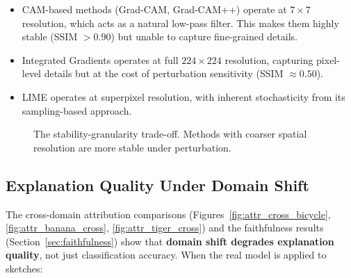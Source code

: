 \documentclass[12pt, a4paper]{article}
\begin{document}
\begin{itemize}[leftmargin=*]
    \item CAM-based methods (Grad-CAM, Grad-CAM++) operate at $7 \times 7$
          resolution, which acts as a natural low-pass filter.  This makes them
          highly stable (SSIM $> 0.90$) but unable to capture fine-grained
          details.
    \item Integrated Gradients operates at full $224 \times 224$ resolution,
          capturing pixel-level details but at the cost of perturbation
          sensitivity (SSIM $\approx 0.50$).
    \item LIME operates at superpixel resolution, with inherent stochasticity
          from its sampling-based approach.
\end{itemize}

\begin{figure}[H]
\centering
{}
\caption{The stability-granularity trade-off.  Methods with coarser spatial
resolution are more stable under perturbation.}
\label{fig:stability_tradeoff}
\end{figure}

\subsection{Explanation Quality Under Domain Shift}

The cross-domain attribution comparisons (Figures~\ref{fig:attr_cross_bicycle},
\ref{fig:attr_banana_cross}, \ref{fig:attr_tiger_cross}) and the faithfulness
results (Section~\ref{sec:faithfulness}) show that \textbf{domain shift
degrades explanation quality}, not just classification accuracy.  When the real
model is applied to sketches:
\end{document}
